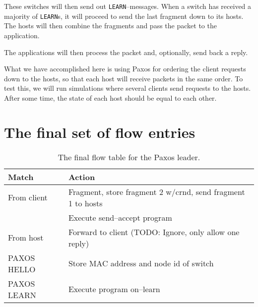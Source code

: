 These switches will then send out \texttt{LEARN}--messages.
When a switch has received a majority of \texttt{LEARN}s, it will proceed to
send the last fragment down to its hosts.  The hosts will then combine the
fragments and pass the packet to the application.

The applications will then process the packet and, optionally, send back a
reply.


What we have accomplished here is using Paxos for ordering the client
requests down to the hosts, so that each host will receive packets in the
same order.  To test this, we will run simulations where several clients
send requests to the hosts. After some time, the state of each host should
be equal to each other.

\section{The final set of flow entries}



\begin{table}[H]
  \centering
  \begin{tabular}{|l|l|}
    \hline \textbf{Match} & \textbf{Action} \\
    \hline From client & Fragment, store fragment 2 w/crnd, send fragment 1 to hosts \\
                       & Execute send--accept program \\
    \hline From host & Forward to client (TODO: Ignore, only allow one reply) \\
    \hline PAXOS HELLO & Store MAC address and node id of switch \\
    \hline PAXOS LEARN & Execute program on--learn \\
    \hline
  \end{tabular}
  \caption{The final flow table for the Paxos leader.}
  \label{table:complete.match.leader}
\end{table}

